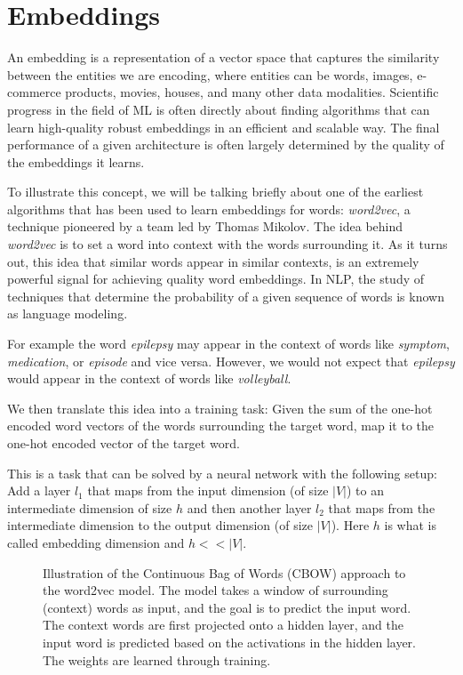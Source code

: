 \section{Embeddings}
\label{embeddings}
An embedding is a representation of a vector space that captures the similarity between the entities we are encoding, where entities can be words, images, e-commerce products, movies, houses, and many other data modalities.
Scientific progress in the field of ML is often directly about finding algorithms that can learn high-quality robust embeddings in an efficient and scalable way. The final performance of a given architecture is often largely determined by the quality of the embeddings it learns.

To illustrate this concept, we will be talking briefly about one of the earliest algorithms that has been used to learn embeddings for words: \textit{word2vec}, a technique pioneered by a team led by Thomas Mikolov.\cite{https://doi.org/10.48550/arxiv.1301.3781}
The idea behind \textit{word2vec} is to set a word into context with the words surrounding it. As it turns out, this idea that similar words appear in similar contexts, is an extremely powerful signal for achieving quality word embeddings. In NLP, the study of techniques that determine the probability of a given sequence of words is known as language modeling.

For example the word \textit{epilepsy} may appear in the context of words like \textit{symptom}, \textit{medication}, or \textit{episode} and vice versa.
However, we would not expect that \textit{epilepsy} would appear in the context of words like \textit{volleyball}.

We then translate this idea into a training task:
Given the sum of the one-hot encoded word vectors of the words surrounding the target word, map it to the one-hot encoded vector of the target word.

This is a task that can be solved by a neural network with the following setup:
Add a layer $l_1$ that maps from the input dimension (of size $|V|$) to an intermediate dimension of size $h$ and then another layer $l_2$ that maps from the intermediate dimension to the output dimension (of size $|V|$).
Here $h$ is what is called embedding dimension and $h << |V|$.

\begin{figure}
  
  \caption{Illustration of the Continuous Bag of Words (CBOW) approach to the word2vec model. The model takes a window of surrounding (context) words as input, and the goal is to predict the input word. The context words are first projected onto a hidden layer, and the input word is predicted based on the activations in the hidden layer. The weights are learned through training.}
  \label{fig:word2vec_cbow}
\end{figure}

